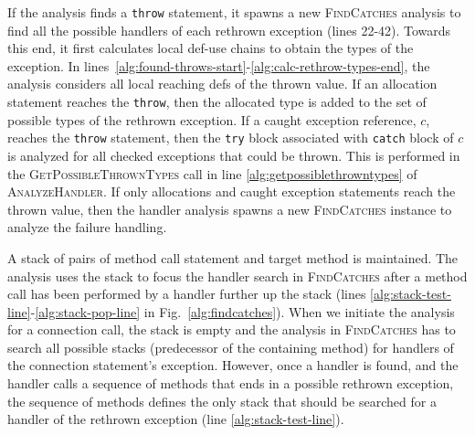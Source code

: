 If the analysis finds a \lstinline!throw!  statement, it %
spawns a new \textsc{FindCatches} analysis to find all the possible
handlers of each rethrown exception (lines 22-42).
Towards this end, it first calculates local def-use chains to obtain the types of the
exception.  In lines~\ref{alg:found-throws-start}-\ref{alg:calc-rethrow-types-end},
the analysis considers all local reaching defs of the thrown value.  If an allocation statement
reaches the \lstinline!throw!, then the allocated type is added to the
set of possible types of the rethrown exception. If a caught exception
reference, $c$, reaches
the \lstinline!throw! statement, then the \lstinline!try! block
associated with \lstinline!catch! block of $c$ is analyzed for all
checked exceptions that could be thrown.  This is performed in
the \textsc{GetPossibleThrownTypes} call in line
\ref{alg:getpossiblethrowntypes} of \textsc{AnalyzeHandler}.  If only
allocations and caught exception statements reach the thrown value,
then the handler analysis spawns a new \textsc{FindCatches} instance
to analyze the failure handling.




A stack of pairs of method call statement and target method is
maintained.  The analysis uses the stack to focus the handler search
in \textsc{FindCatches} after a method call has been performed by a
handler further up the stack (lines
\ref{alg:stack-test-line}-\ref{alg:stack-pop-line} in Fig.~\ref{alg:findcatches}). When we initiate the analysis for a
connection call, the stack is empty and the analysis in
\textsc{FindCatches} has to search all possible stacks (predecessor of
the containing method) for handlers of the connection statement's
exception.  However, once a handler is found, and the handler calls a
sequence of methods that ends in a possible rethrown exception, the
sequence of methods defines the only stack that should be searched for
a handler of the rethrown exception (line \ref{alg:stack-test-line}).

